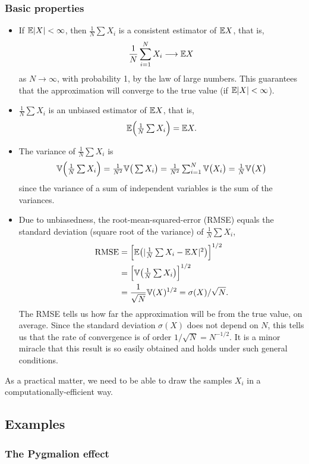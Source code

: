 \documentclass[12pt]{article}
\begin{document}
\subsubsection{Basic properties}
\begin{itemize}
\item If $\mathbb{E}|X|<\infty$, then $\tfrac{1}{N}\sum X_i$ is a consistent estimator of $\mathbb{E} X$, that is,
$$\frac{1}{N}\sum_{i = 1}^N X_i\longrightarrow \mathbb{E} X$$
as $N\to \infty$, with probability 1, by the law of large numbers. This guarantees that the approximation will converge to the true value (if $\mathbb{E}|X|<\infty$).
\item $\tfrac{1}{N}\sum X_i$ is an unbiased estimator of $\mathbb{E} X$, that is,
$$\mathbb{E}\Big(\tfrac{1}{N}\textstyle\sum X_i\Big) = \mathbb{E} X.$$
\item The variance of $\tfrac{1}{N}\sum X_i$ is 
$$ \mathbb{V}\Big(\tfrac{1}{N}\textstyle\sum X_i\Big)
= \tfrac{1}{N^2}\mathbb{V}\big(\textstyle\sum X_i\big) = \frac{1}{N^2}\sum_{i = 1}^N \mathbb{V}\big(X_i\big)
= \frac{1}{N}\mathbb{V}\big(X\big)$$
since the variance of a sum of independent variables is the sum of the variances.
\item Due to unbiasedness, the root-mean-squared-error (RMSE) equals the standard deviation (square root of the variance) of $\tfrac{1}{N}\sum X_i$,
\begin{align}
\text{RMSE} &= \Big[\mathbb{E}\big(|\tfrac{1}{N}\textstyle\sum X_i - \mathbb{E} X|^2\big)\Big]^{1/2}\notag\\
& = \Big[\mathbb{V}\big(\tfrac{1}{N}\textstyle\sum X_i\big)\Big]^{1/2}\notag\\
&= \frac{1}{\sqrt N}\mathbb{V}(X)^{1/2}= \sigma(X)/{\sqrt N}.\label{equation:RMSE}
\end{align}
The RMSE tells us how far the approximation will be from the true value, on average. Since the standard deviation $\sigma(X)$ does not depend on $N$, this tells us that the rate of convergence is of order $1/\sqrt N = N^{-1/2}$. It is a minor miracle that this result is so easily obtained and holds under such general conditions.
\end{itemize}
As a practical matter, we need to be able to draw the samples $X_i$ in a computationally-efficient way. 

\subsection{Examples}


\subsubsection{The Pygmalion effect}
\end{document}
